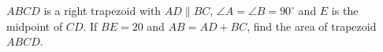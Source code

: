 $ABCD$ is a right trapezoid with $AD \parallel BC$, $\angle A=\angle B=90^{\circ}$ and $E$ is the midpoint of $CD$. If $BE=20$ and $AB=AD+BC$, find the area of trapezoid $ABCD$.
